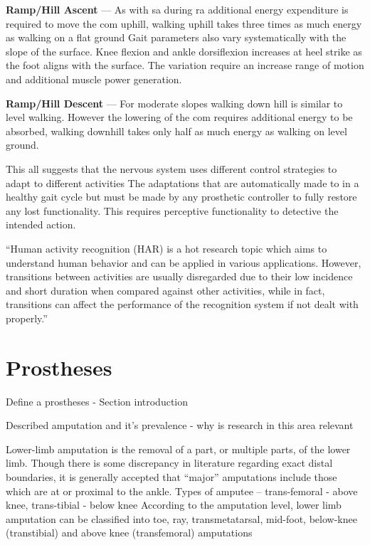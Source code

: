 \textbf{Ramp/Hill Ascent} --- As with \acrshort{sa} during \acrshort{ra} additional energy expenditure is required to move the \acrshort{com} uphill\cite{Franz2012a}, walking uphill takes three times as much energy as walking on a flat ground\cite{Matsumoto2017} Gait parameters also vary systematically with the slope of the surface\cite{Kimel-Naor2017}. Knee flexion and ankle dorsiflexion increases at heel strike as the foot aligns with the surface. The variation require an increase range of motion and additional muscle power generation.\cite{McIntosh2006}

\textbf{Ramp/Hill Descent} --- For moderate slopes walking down hill is similar to level walking. However the lowering of the \acrshort{com} requires additional energy to be absorbed\cite{Franz2012a}, walking downhill takes only half as much energy as walking on level ground\cite{Matsumoto2017}.

This all suggests that the nervous system uses different control strategies to adapt to different activities\cite{Lay2007} The adaptations that are automatically made to in a healthy gait cycle but must be made by any prosthetic controller to fully restore any lost functionality. This requires perceptive functionality to detective the intended action.

``Human activity recognition (HAR) is a hot research topic which aims to understand human behavior and can be applied in various applications. However, transitions between activities are usually disregarded due to their low incidence and short duration when compared against other activities, while in fact, transitions can affect the performance of the recognition system if not dealt with properly.''\cite{Li2019}

\section{Prostheses}
Define a prostheses - Section introduction

Described amputation and it's prevalence - why is research in this area relevant 


Lower-limb amputation is the removal of a part, or multiple parts, of the lower limb. Though there is some discrepancy in literature regarding exact distal boundaries, it is generally accepted that “major” amputations include those which are at or proximal to the ankle.
Types of amputee -- trans-femoral - above knee, trans-tibial - below knee
According to the amputation level, lower limb amputation can be classified into toe, ray, transmetatarsal, mid-foot, below-knee (transtibial) and above knee (transfemoral) amputations

